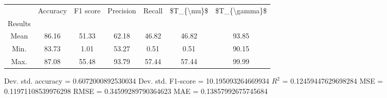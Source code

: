 \begin{tabular}{|c|c|c|c|c|c|c|}
\toprule
{} &  Accuracy &  F1 score &  Precision &  Recall &  \$T\_\{\textbackslash mu\}\$ &  \$T\_\{\textbackslash gamma\}\$ \\
Results &           &           &            &         &            &               \\
\hline
Mean    &     86.16 &     51.33 &      62.18 &   46.82 &      46.82 &         93.85 \\
Min.    &     83.73 &      1.01 &      53.27 &    0.51 &       0.51 &         90.15 \\
Max.    &     87.08 &     55.48 &      93.79 &   57.44 &      57.44 &         99.99 \\
\bottomrule
\end{tabular}

 Dev. std. accuracy = 0.6072000892530034
 Dev. std. F1-score = 10.195093264669934
 $R^2$ = 0.12459447629698284
 MSE = 0.11971108539976298
 RMSE = 0.34599289790364623
 MAE = 0.13857992675745684